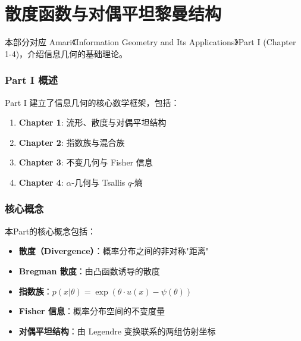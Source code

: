 \part{散度函数与对偶平坦黎曼结构}\label{part:amari-partI}

本部分对应 Amari《Information Geometry and Its Applications》Part I (Chapter 1-4)，介绍信息几何的基础理论。

\section{Part I 概述}

Part I 建立了信息几何的核心数学框架，包括：

\begin{enumerate}
    \item \textbf{Chapter 1}: 流形、散度与对偶平坦结构
    \item \textbf{Chapter 2}: 指数族与混合族
    \item \textbf{Chapter 3}: 不变几何与 Fisher 信息
    \item \textbf{Chapter 4}: $\alpha$-几何与 Tsallis $q$-熵
\end{enumerate}

\section{核心概念}

本Part的核心概念包括：

\begin{itemize}
    \item \textbf{散度（Divergence）}：概率分布之间的非对称"距离"
    \item \textbf{Bregman 散度}：由凸函数诱导的散度
    \item \textbf{指数族}：$p(x|\theta) = \exp(\theta \cdot u(x) - \psi(\theta))$
    \item \textbf{Fisher 信息}：概率分布空间的不变度量
    \item \textbf{对偶平坦结构}：由 Legendre 变换联系的两组仿射坐标
\end{itemize}

